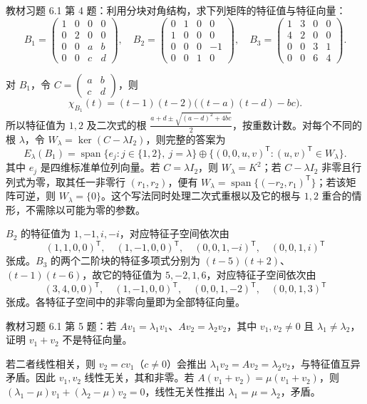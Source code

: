 \begin{example}
\label{ex:xie-61-04}
教材习题 6.1 第 4 题：利用分块对角结构，求下列矩阵的特征值与特征向量：
\[
 B_1=\begin{pmatrix}1&0&0&0\\0&2&0&0\\0&0&a&b\\0&0&c&d\end{pmatrix},\quad
 B_2=\begin{pmatrix}0&1&0&0\\1&0&0&0\\0&0&0&-1\\0&0&1&0\end{pmatrix},\quad
 B_3=\begin{pmatrix}1&3&0&0\\4&2&0&0\\0&0&3&1\\0&0&6&4\end{pmatrix}.
\]
\end{example}
\begin{solve}
对 $B_1$，令 $C=\begin{pmatrix}a&b\\c&d\end{pmatrix}$，则
\[
 \chi_{B_1}(t)=(t-1)(t-2)\bigl((t-a)(t-d)-bc\bigr).
\]
所以特征值为 $1,2$ 及二次式的根 $\frac{a+d\pm\sqrt{(a-d)^2+4bc}}2$，按重数计数。对每个不同的根 $\lambda$，令 $W_\lambda=\ker(C-\lambda I_2)$，则完整的答案为
\[
 E_\lambda(B_1)=\operatorname{span}\{e_j:j\in\{1,2\},\ j=\lambda\}
 \oplus\{(0,0,u,v)^{\mathsf T}:(u,v)^{\mathsf T}\in W_\lambda\}.
\]
其中 $e_j$ 是四维标准单位列向量。若 $C=\lambda I_2$，则 $W_\lambda=K^2$；若 $C-\lambda I_2$ 非零且行列式为零，取其任一非零行 $(r_1,r_2)$，便有 $W_\lambda=\operatorname{span}\{(-r_2,r_1)^{\mathsf T}\}$；若该矩阵可逆，则 $W_\lambda=\{0\}$。这个写法同时处理二次式重根以及它的根与 $1,2$ 重合的情形，不需除以可能为零的参数。

$B_2$ 的特征值为 $1,-1,i,-i$，对应特征子空间依次由
\[
 (1,1,0,0)^{\mathsf T},\quad(1,-1,0,0)^{\mathsf T},\quad
 (0,0,1,-i)^{\mathsf T},\quad(0,0,1,i)^{\mathsf T}
\]
张成。$B_3$ 的两个二阶块的特征多项式分别为 $(t-5)(t+2)$、$(t-1)(t-6)$，故它的特征值为 $5,-2,1,6$，对应特征子空间依次由
\[
 (3,4,0,0)^{\mathsf T},\quad(1,-1,0,0)^{\mathsf T},\quad
 (0,0,1,-2)^{\mathsf T},\quad(0,0,1,3)^{\mathsf T}
\]
张成。各特征子空间中的非零向量即为全部特征向量。
\end{solve}

\begin{example}
\label{ex:xie-61-05}
教材习题 6.1 第 5 题：若 $Av_1=\lambda_1v_1$、$Av_2=\lambda_2v_2$，其中 $v_1,v_2\ne0$ 且 $\lambda_1\ne\lambda_2$，证明 $v_1+v_2$ 不是特征向量。
\end{example}
\begin{solve}
若二者线性相关，则 $v_2=cv_1$（$c\ne0$）会推出 $\lambda_1v_2=Av_2=\lambda_2v_2$，与特征值互异矛盾。因此 $v_1,v_2$ 线性无关，其和非零。若 $A(v_1+v_2)=\mu(v_1+v_2)$，则 $(\lambda_1-\mu)v_1+(\lambda_2-\mu)v_2=0$，线性无关性推出 $\lambda_1=\mu=\lambda_2$，矛盾。
\end{solve}

